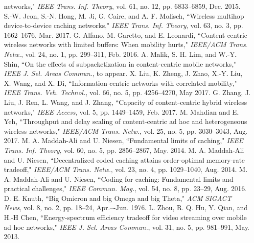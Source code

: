 \documentclass[10pt,journal,compsoc,onecolumn]{IEEEtran}
\begin{document}
\begin{thebibliography}{99}
networks," \emph{IEEE Trans. Inf. Theory}, vol. 61, no. 12, pp.
6833--6859, Dec. 2015.
 S.-W. Jeon, S.-N. Hong, M. Ji, G. Caire, and A. F. Molisch, ``Wireless multihop device-to-device caching networks," \emph{IEEE Trans. Inf. Theory}, vol. 63, no. 3, pp. 1662--1676, Mar. 2017.
G. Alfano, M. Garetto, and E. Leonardi, ``Content-centric wireless networks with limited buffers: When mobility hurts," \emph{IEEE/ACM Trans. Netw.}, vol. 24, no. 1, pp. 299--311, Feb. 2016.
A. Malik, S. H. Lim, and W.-Y. Shin, ``On the effects of subpacketization in content-centric mobile networks," \emph{IEEE J. Sel. Areas Commun.}, to appear.
X. Liu, K. Zheng, J. Zhao, X.-Y. Liu, X. Wang, and X. Di, ``Information-centric networks with correlated mobility," \emph{IEEE Trans. Veh. Technol.}, vol. 66, no. 5, pp. 4256--4270, May 2017.
G. Zhang, J. Liu, J. Ren, L. Wang, and J. Zhang, ``Capacity of content-centric hybrid wireless networks," \emph{IEEE Access}, vol. 5, pp. 1449--1459, Feb. 2017.
M. Mahdian and E. Yeh, ``Throughput and delay scaling of content-centric ad hoc and heterogeneous wireless networks," \emph{IEEE/ACM Trans. Netw.}, vol. 25, no. 5, pp. 3030--3043, Aug. 2017.
M. A. Maddah-Ali and U. Niesen, ``Fundamental limits of caching," \emph{IEEE Trans. Inf. Theory}, vol. 60, no. 5, pp. 2856--2867, May. 2014.
M. A. Maddah-Ali and U. Niesen, ``Decentralized coded caching attains order-optimal memory-rate tradeoff," \emph{IEEE/ACM Trans. Netw.}, vol. 23, no. 4, pp. 1029--1040, Aug. 2014.
M. A. Maddah-Ali and U. Niesen, ``Coding for caching: Fundamental limits and practical challenges," \emph{IEEE Commun. Mag.}, vol. 54, no. 8, pp. 23--29, Aug. 2016.
D. E. Knuth, ``Big Omicron and big Omega and big Theta," \emph{ACM SIGACT News}, vol. 8, no. 2, pp. 18--24, Apr.–-Jun. 1976.
L. Zhou, R. Q. Hu, Y. Qian, and H.-H Chen, ``Energy-spectrum efficiency tradeoff for video streaming over mobile ad hoc networks," \emph{IEEE J. Sel. Areas Commun.}, vol. 31, no. 5, pp. 981--991, May. 2013.

\end{thebibliography}
\end{document}
